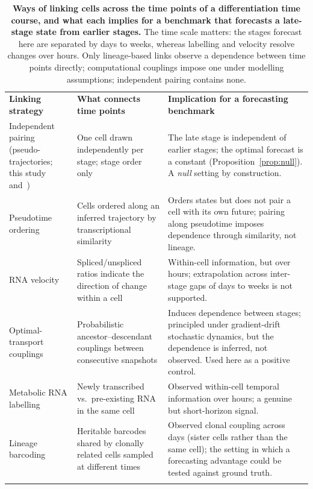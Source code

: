 \documentclass[10pt,letterpaper]{article}
\newlength\savedwidth
\newcommand\thickhline{\noalign{\global\savedwidth\arrayrulewidth\global\arrayrulewidth 2pt}%
\hline
\noalign{\global\arrayrulewidth\savedwidth}}
\begin{document}
\begin{table}[!ht]
\centering
\caption{\textbf{Ways of linking cells across the time points of a differentiation time course, and what each implies for a benchmark that forecasts a late-stage state from earlier stages.} The time scale matters: the stages forecast here are separated by days to weeks, whereas labelling and velocity resolve changes over hours. Only lineage-based links observe a dependence between time points directly; computational couplings impose one under modelling assumptions; independent pairing contains none.}
\label{tab:rigor}
\begin{tabular}{>{\raggedright\arraybackslash}p{3.0cm} >{\raggedright\arraybackslash}p{4.8cm} >{\raggedright\arraybackslash}p{7.0cm}}
\thickhline
\textbf{Linking strategy} & \textbf{What connects time points} & \textbf{Implication for a forecasting benchmark} \\
\thickhline
Independent pairing (pseudo-trajectories; this study and~\cite{kanu2026transformer}) & One cell drawn independently per stage; stage order only & The late stage is independent of earlier stages; the optimal forecast is a constant (Proposition~\ref{prop:null}). A \emph{null} setting by construction. \\
\hline
Pseudotime ordering~\cite{haghverdi2016diffusion,saelens2019comparison} & Cells ordered along an inferred trajectory by transcriptional similarity & Orders states but does not pair a cell with its own future; pairing along pseudotime imposes dependence through similarity, not lineage. \\
\hline
RNA velocity~\cite{la2018rna,bergen2020generalizing} & Spliced/unspliced ratios indicate the direction of change within a cell & Within-cell information, but over hours; extrapolation across inter-stage gaps of days to weeks is not supported. \\
\hline
Optimal-transport couplings~\cite{schiebinger2019optimal,lavenant2024toward} & Probabilistic ancestor--descendant couplings between consecutive snapshots & Induces dependence between stages; principled under gradient-drift stochastic dynamics, but the dependence is inferred, not observed. Used here as a positive control. \\
\hline
Metabolic RNA labelling~\cite{erhard2019scslam,cao2020scifate} & Newly transcribed vs.\ pre-existing RNA in the same cell & Observed within-cell temporal information over hours; a genuine but short-horizon signal. \\
\hline
Lineage barcoding~\cite{weinreb2020lineage} & Heritable barcodes shared by clonally related cells sampled at different times & Observed clonal coupling across days (sister cells rather than the same cell); the setting in which a forecasting advantage could be tested against ground truth. \\
\thickhline
\end{tabular}
\end{table}
\end{document}
